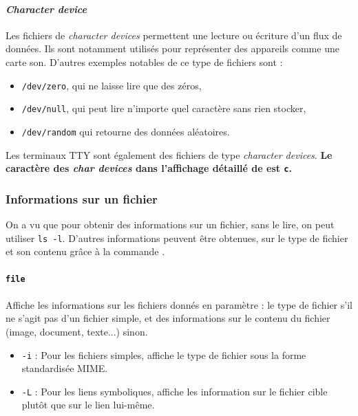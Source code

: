 \paragraph{\textit{Character device}} \label{sec:file_char}
Les fichiers de \textit{character devices} permettent une lecture ou écriture d'un flux de données. Ils sont notamment utilisés pour représenter des appareils comme une carte son. D'autres exemples notables de ce type de fichiers sont :
\begin{itemize}
    \item \texttt{/dev/zero}, qui ne laisse lire que des zéros,
    \item \texttt{/dev/null}, qui peut lire n'importe quel caractère sans rien stocker,
    \item \texttt{/dev/random} qui retourne des données aléatoires.
\end{itemize}
Les terminaux TTY sont également des fichiers de type \textit{character devices}. \newline
\textbf{Le caractère des \textit{char devices} dans l'affichage détaillé de  est \texttt{c}.}

\subsubsection{Informations sur un fichier}

On a vu que pour obtenir des informations sur un fichier, sans le lire, on peut utiliser \texttt{ls -l}. D'autres informations peuvent être obtenues, sur le type de fichier et son contenu grâce à la commande .

\paragraph{\texttt{file}} 
Affiche les informations sur les fichiers donnés en paramètre : le type de fichier s'il ne s'agit pas d'un fichier simple, et des informations sur le contenu du fichier (image, document, texte...) sinon.
\begin{itemize}
    \item \texttt{-i} : Pour les fichiers simples, affiche le type de fichier sous la forme standardisée MIME.
    \item \texttt{-L} : Pour les liens symboliques, affiche les information sur le fichier cible plutôt que sur le lien lui-même.
\end{itemize}

\newpage

